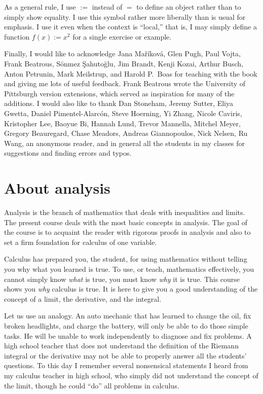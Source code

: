As a general rule, I use $:=$ instead of $=$ to define an
object rather than to simply show equality.  I use this symbol rather more
liberally than is usual for emphasis.
I use it even when the context is ``local,''
that is, I may simply define a function $f(x) := x^2$
for a single exercise or example.

\medskip

Finally, I would like to acknowledge Jana Ma\v{r}\'ikov\'a,
Glen Pugh, Paul Vojta, Frank Beatrous, S\"{o}nmez \c{S}ahuto\u{g}lu,
Jim Brandt, Kenji Kozai, Arthur Busch,  Anton Petrunin,
Mark Meilstrup, and Harold P.\ Boas
for teaching with the book and giving me lots of useful feedback.
Frank Beatrous wrote the University of Pittsburgh version extensions, which
served as inspiration for many of the additions.
I would also like to thank
Dan Stoneham, Jeremy Sutter, Eliya Gwetta, Daniel Pimentel-Alarc\'on,
Steve Hoerning, Yi Zhang, Nicole Caviris,
Kristopher Lee, Baoyue Bi, Hannah Lund,
Trevor Mannella, Mitchel Meyer, Gregory Beauregard,
Chase Meadors, Andreas Giannopoulos, Nick Nelsen,
Ru Wang,
an anonymous reader, and in general all the students in my classes for suggestions and
finding errors and typos.


\sectionnewpage
\section{About analysis} \label{sec:aboutra}

Analysis is the branch of mathematics that deals with inequalities and
limits.  The present course deals with the most basic 
concepts in analysis.  The goal of the course is to acquaint the reader
with rigorous proofs in analysis and also to
set a firm foundation for calculus of one variable.

Calculus has prepared you, the student, for using mathematics without telling
you why what you learned is true.  To use, or teach, mathematics
effectively, you cannot simply know \emph{what} is true, you must know
\emph{why} it is true.  This course shows you \emph{why} calculus
is true.  It is here to give you a good understanding of the concept of a
limit, the derivative, and the integral.

Let us use an analogy.
An auto mechanic that has learned to change the oil, fix broken headlights,
and charge the battery, will only be able to do those simple tasks.  He
will be unable to work independently to diagnose and fix problems.
A high school teacher that does not understand the definition of the Riemann
integral or the derivative may not be able to properly answer all the
students' questions.
To this day I remember several nonsensical statements I heard
from my calculus teacher in high school, who simply did not understand
the concept of the limit, though he could ``do'' all problems in calculus.

